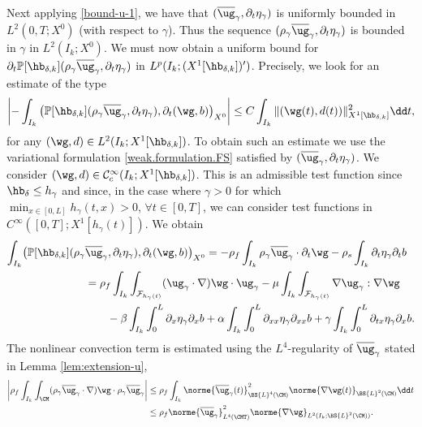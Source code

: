 Next applying \eqref{bound-u-1}, we have that $(\overline{\ug}_{\gamma},\partial_{t}\eta_{\gamma})$ is uniformly bounded in $L^{2}(0,T;X^0)$ (with respect to $\gamma$). Thus the sequence $(\rho_{\gamma}\overline{\ug}_{\gamma},\partial_{t}\eta_{\gamma})$ is bounded in $\gamma$ in $L^{2}(I_{k};X^0)$. We must now obtain a uniform bound for
$\partial_{t}\mathbb{P}[\hb_{\delta, k}](\rho_{\gamma}\overline{\ug}_{\gamma},\partial_{t}\eta_{\gamma})$ in $L^p(I_k; (X^1[\hb_{\delta,k}])')$. Precisely, we look for an estimate of the type
\[
\left| -\int_{I_{k}}\left( \mathbb{P}[\hb_{\delta, k}](\rho_{\gamma}\overline{\ug}_{\gamma},\partial_{t}\eta_{\gamma}), \partial_{t}(\wg,b) \right)_{X^0}
\right| \leq C \int_{I_k} \|(\wg(t),d(t))\|_{X^1[\hb_{\delta,k}]}^{2}
\dd t,
\]
for any $(\wg,d) \in L^2(I_k; X^1[\hb_{\delta,k}])$.
To obtain such an estimate we use the variational formulation \eqref{weak.formulation.FS} satisfied by $(\overline{\ug}_{\gamma},\partial_{t}\eta_{\gamma})$. We consider
$(\wg,d) \in \mathcal C^{\infty}_c(I_k; X^1[\hb_{\delta,k}])$. This is an admissible test function since $\hb_{\delta}\leq h_\gamma$ and since, in the case where \hbox{$\gamma>0$} for which $\min_{x\in [0, L]}h_\gamma(t, x)>0$, $\forall t\in [0, T]$, we can consider test functions in $C^{\infty}([0, T]; X^1[h_\gamma(t)])$.
We obtain
\begin{align*}
\int_{I_{k}}\bigl( \mathbb{P}[\hb_{\delta, k}](\rho_{\gamma}&\overline{\ug}_{\gamma},\partial_{t}\eta_{\gamma}), \partial_{t}(\wg,b) \bigr)_{X^0}=-\rho_{f}\int_{I_{k}}\rho_{\gamma}\overline{\ug}_{\gamma}\cdot\partial_{t}\wg - \rho_{s}\int_{I_{k}}\partial_{t}\eta_{\gamma}\partial_{t}b\\
&=\rho_{f}\int_{I_{k}}\int_{\mathcal{F}_{h_\gamma(t)}}({\ug}_{\gamma}\cdot\nabla)\wg\cdot{\ug}_{\gamma}-\mu\int_{I_{k}}\int_{\mathcal{F}_{h_\gamma(t)}}\nabla{\ug_\gamma}:\nabla \wg\\
& \qquad -\beta\int_{I_{k}}\int_{0}^{L}\partial_{x}\eta_{\gamma}\partial_{x}b+ \alpha\int_{I_{k}}\int_{0}^{L}\partial_{xx}\eta_{\gamma}\partial_{xx}b +\gamma\int_{I_{k}}\int_{0}^{L}\partial_{tx}\eta_{\gamma}\partial_{x}b.
\end{align*}
The nonlinear convection term is estimated using the $L^{4}$-regularity of $\overline{\ug}_{\gamma}$ stated in Lemma \ref{lem:extension-u},
\[\begin{aligned}
\left\vert\rho_{f} \int_{I_{k}}\int_{\CM}(\rho_{\gamma}\overline{\ug}_{\gamma}\cdot\nabla)\wg\cdot\rho_{\gamma}\overline{\ug}_{\gamma}\right\vert&{}\leq \rho_{f}\int_{I_{k}}\norme{\overline{\ug}_{\gamma}(t)}_{\BS{L}^{4}(\CM)}^{2}\norme{\nabla\wg(t)}_{\BS{L}^{2}(\CM)}\dd t\\
&\leq \rho_{f}\norme{\overline{\ug}_{\gamma}}_{L^{4}(\CMT)}^{2}\norme{\nabla\wg}_{L^{2}(I_{k};\BS{L}^{2}(\CM))}.
\end{aligned}
\]

